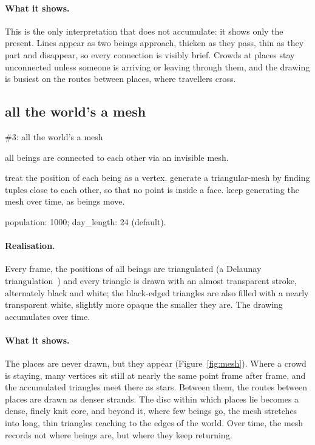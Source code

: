 \paragraph{What it shows.} This is the only interpretation that does not accumulate: it shows only the present. Lines appear as two beings approach, thicken as they pass, thin as they part and disappear, so every connection is visibly brief. Crowds at places stay unconnected unless someone is arriving or leaving through them, and the drawing is busiest on the routes between places, where travellers cross.



\subsection{all the world's a mesh}
\label{sec:mesh}

\begin{interpretation}{\#3: all the world's a mesh}
  \item[thought] all beings are connected to each other via an invisible mesh.
  \item[expression] treat the position of each being as a vertex. generate a triangular-mesh by finding tuples close to each other, so that no point is inside a face. keep generating the mesh over time, as beings move.
  \item[parameters] population: 1000; day\_length: 24 (default).
\end{interpretation}

\paragraph{Realisation.} Every frame, the positions of all beings are triangulated (a Delaunay triangulation~\cite{delaunay1934, delaunator}) and every triangle is drawn with an almost transparent stroke, alternately black and white; the black-edged triangles are also filled with a nearly transparent white, slightly more opaque the smaller they are. The drawing accumulates over time.

\paragraph{What it shows.} The places are never drawn, but they appear (Figure~\ref{fig:mesh}). Where a crowd is staying, many vertices sit still at nearly the same point frame after frame, and the accumulated triangles meet there as stars. Between them, the routes between places are drawn as denser strands. The disc within which places lie becomes a dense, finely knit core, and beyond it, where few beings go, the mesh stretches into long, thin triangles reaching to the edges of the world. Over time, the mesh records not where beings are, but where they keep returning.

